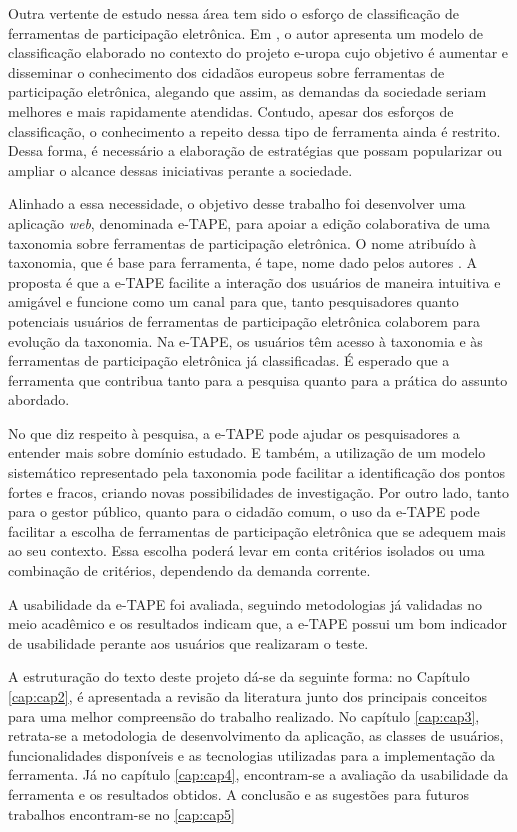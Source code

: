 \par
Outra vertente de estudo nessa área tem sido o esforço de classificação de ferramentas de participação eletrônica. Em  , o autor apresenta um modelo 
de classificação elaborado no contexto do projeto \acrfull{e-uropa} cujo objetivo é aumentar e disseminar o conhecimento dos cidadãos europeus sobre ferramentas de participação 
eletrônica, alegando que assim, as demandas da sociedade seriam melhores e mais rapidamente atendidas. Contudo, apesar dos esforços de classificação, o conhecimento a repeito dessa 
tipo de ferramenta ainda é restrito. Dessa forma, é necessário a elaboração de estratégias que possam popularizar ou ampliar o alcance dessas iniciativas perante a sociedade.

\par
Alinhado a essa necessidade, o objetivo desse trabalho foi desenvolver uma aplicação \textit{web}, denominada e-TAPE, para apoiar a edição colaborativa de uma taxonomia sobre 
ferramentas de participação eletrônica. O nome atribuído à taxonomia, que é base para ferramenta, é \acrfull{tape}, nome dado pelos autores . 
A proposta é que a e-TAPE facilite a interação dos usuários de maneira intuitiva e amigável e funcione como um canal para que, tanto pesquisadores quanto potenciais usuários de
ferramentas de participação eletrônica colaborem para evolução da taxonomia. Na e-TAPE, os usuários têm acesso à taxonomia e às ferramentas de participação eletrônica já classificadas.
É esperado que a ferramenta que contribua tanto para a pesquisa quanto para a prática do assunto abordado. 

\par
No que diz respeito à pesquisa, a e-TAPE pode ajudar os pesquisadores a entender mais sobre domínio estudado. E também, a utilização de um modelo sistemático representado pela taxonomia 
pode facilitar a identificação dos pontos fortes e fracos, criando novas possibilidades de investigação. Por outro lado, tanto para o gestor público, quanto para o cidadão comum, 
o uso da e-TAPE pode facilitar a escolha de ferramentas de participação eletrônica que se adequem mais ao seu contexto. Essa escolha poderá levar em conta critérios 
isolados ou uma combinação de critérios, dependendo da demanda corrente. 

\par
A usabilidade da e-TAPE foi avaliada, seguindo metodologias já validadas no meio acadêmico e os resultados indicam que, a e-TAPE possui um bom indicador de usabilidade perante aos 
usuários que realizaram o teste. 

\par
A estruturação do texto deste projeto dá-se da seguinte forma: no Capítulo \ref{cap:cap2}, é apresentada a revisão da literatura junto dos principais conceitos para uma melhor 
compreensão do trabalho realizado. No capítulo \ref{cap:cap3}, retrata-se a metodologia de desenvolvimento da aplicação, as classes de usuários, funcionalidades disponíveis e
as tecnologias utilizadas para a implementação da ferramenta. Já no capítulo \ref{cap:cap4}, encontram-se a avaliação da usabilidade da ferramenta e os resultados obtidos. 
A conclusão e as sugestões para futuros trabalhos encontram-se no \ref{cap:cap5}
